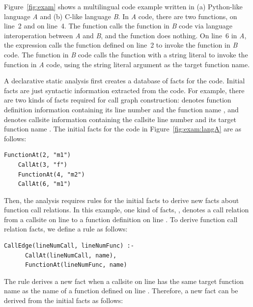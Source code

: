 Figure~\ref{fig:exam} shows a multilingual code example written in (a)
Python-like language {\it A} and (b) C-like language {\it B}. In {\it A} code,
there are two functions,  on line~2 and  on line~4. The
function  calls the function  in {\it B} code via language
interoperation between {\it A} and {\it B}, and the function  does
nothing. On line~6 in {\it A}, the expression  calls the function
 defined on line~2 to invoke the function  in {\it B} code.
The function  in {\it B} code calls the  function
with a string literal  to invoke the function  in {\it A}
code, using the string literal argument as the target function name.


A declarative static analysis first creates a database of facts for the code.
Initial facts are just syntactic information extracted from the code.  For
example, there are two kinds of facts required for call graph construction:
 denotes function definition information
containing its line number  and the function name ,
and  denotes callsite information containing the
callsite line number  and its target function name . The initial facts for the code in Figure~\ref{fig:exam:langA} are as
follows:

\begin{lstlisting}[style=mrule]
    FunctionAt(2, "m1")
    CallAt(3, "f")
    FunctionAt(4, "m2")
    CallAt(6, "m1")
\end{lstlisting}

Then, the analysis requires rules for the initial facts to derive new facts
about function call relations. In this example, one kind of facts, , denotes a call relation from a callsite on
line  to a function definition on line . To derive function call relation facts, we define a rule as
follows:

\begin{lstlisting}[style=mrule]
    CallEdge(lineNumCall, lineNumFunc) :-
      CallAt(lineNumCall, name),
      FunctionAt(lineNumFunc, name)
\end{lstlisting}

\noindent
The rule derives a new fact  when a
callsite on line  has the same target function name as the
name of a function defined on line . Therefore, a new fact
can be derived from the initial facts as follows:

